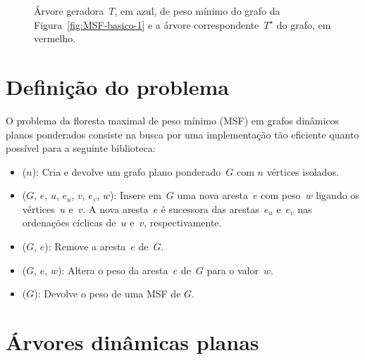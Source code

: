 \begin{figure}[htb]
\scalebox{1.5}{
\centering

}
\caption{Árvore geradora~$T$, em azul, de peso mínimo do grafo da Figura~\ref{fig:MSF-basico-1} e a árvore correspondente~$T^\star$ do grafo, em vermelho.}
\label{fig:MSF-figura-2}
\end{figure}





\section{Definição do problema}
\label{sec:definition-MSF}
O problema da floresta maximal de peso mínimo (MSF) em grafos dinâmicos planos ponderados consiste na busca por uma implementação tão eficiente quanto possível para a seguinte biblioteca:

\begin{itemize}
\item \MSFCreate($n$): Cria e devolve um grafo plano ponderado~$G$ com $n$ vértices isolados.
\item \MSFaddEdge($G$, $e$, $u$, $e_u$, $v$, $e_v$, $w$): Insere em~$G$ uma nova aresta~$e$ com peso~$w$ ligando os vértices~$u$ e~$v$. A nova aresta~$e$ é sucessora das arestas~$e_u$ e~$e_v$ nas ordenações cíclicas de~$u$ e~$v$, respectivamente.
\item \MSFdelEdge($G$, $e$): Remove a aresta~$e$ de~$G$.
\item \MSFupdate($G$, $e$, $w$): Altera o peso da aresta~$e$ de~$G$ para o valor~$w$.
\item \MSFweight($G$): Devolve o peso de uma MSF de $G$.
\end{itemize}


\section{Árvores dinâmicas planas}
\label{sec:EODT}


